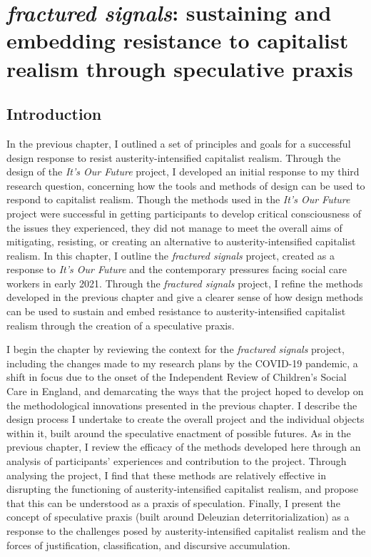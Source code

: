 \chapter{\textit{fractured signals}: sustaining and embedding resistance to capitalist realism through speculative praxis}
\label{ch:8}

\section{Introduction}
In the previous chapter, I outlined a set of principles and goals for a successful design response to resist austerity-intensified capitalist realism. Through the design of the \emph{It's Our Future} project, I developed an initial response to my third research question, concerning how the tools and methods of design can be used to respond to capitalist realism. Though the methods used in the \emph{It's Our Future} project were successful in getting participants to develop critical consciousness of the issues they experienced, they did not manage to meet the overall aims of mitigating, resisting, or creating an alternative to austerity-intensified capitalist realism. In this chapter, I outline the \emph{fractured signals} project, created as a response to \emph{It's Our Future} and the contemporary pressures facing social care workers in early 2021. Through the \emph{fractured signals} project, I refine the methods developed in the previous chapter and give a clearer sense of how design methods can be used to sustain and embed resistance to austerity-intensified capitalist realism through the creation of a speculative praxis.

I begin the chapter by reviewing the context for the \emph{fractured signals} project, including the changes made to my research plans by the COVID-19 pandemic, a shift in focus due to the onset of the Independent Review of Children's Social Care in England, and demarcating the ways that the project hoped to develop on the methodological innovations presented in the previous chapter. I describe the design process I undertake to create the overall project and the individual objects within it, built around the speculative enactment of possible futures. As in the previous chapter, I review the efficacy of the methods developed here through an analysis of participants' experiences and contribution to the project. Through analysing the project, I find that these methods are relatively effective in disrupting the functioning of austerity-intensified capitalist realism, and propose that this can be understood as a praxis of speculation. Finally, I present the concept of speculative praxis (built around Deleuzian deterritorialization) as a response to the challenges posed by austerity-intensified capitalist realism and the forces of justification, classification, and discursive accumulation.

